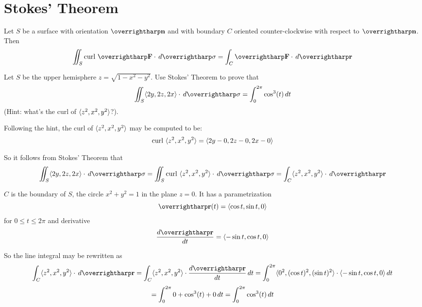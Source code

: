 \documentclass[letterpaper, twoside, 12pt]{book}
\begin{document}
\section{Stokes' Theorem}%

\begin{theorem}
  Let $S$ be a surface with orientation $\vect{n}$
  and with boundary $C$ oriented counter-clockwise with respect to $\vect{n}$.
  Then
  \[
    \iint_S \text{curl }\vect{F}\cdot\dvar{\vect\sigma}
      =
    \int_C \vect{F}\cdot\dvar{\vect{r}}
  \]
\end{theorem}

          \begin{problem}
            Let $S$ be the upper hemisphere $z=\sqrt{1-x^2-y^2}$. Use
            Stokes' Theorem to prove that
            \[
              \iint_S \<2y,2z,2x\>\cdot\dvar{\vect\sigma}
                =
              \int_0^{2\pi} \cos^3(t) \dvar{t}
            \]
            (Hint: what's the curl of $\langle z^2,x^2,y^2\rangle$?).
          \end{problem}

          \begin{solution}
            Following the hint, the curl of $\langle z^2,x^2,y^2\rangle$ may be computed
            to be:
            \[
              \text{curl }\langle z^2,x^2,y^2\rangle
                =
              \langle2y-0,2z-0,2x-0\rangle
            \]

            So it follows from Stokes' Theorem that
            \[
              \iint_S \<2y,2z,2x\>\cdot\dvar{\vect\sigma}
                =
              \iint_S \text{curl }\<z^2,x^2,y^2\>\cdot\dvar{\vect\sigma}
                =
              \int_C \<z^2,x^2,y^2\>\cdot\dvar{\vect r}
            \]

            $C$ is the boundary of $S$, the circle $x^2+y^2=1$ in the
            plane $z=0$. It has a parametrization
            \[
              \vect{r}(t) = \<\cos t,\sin t, 0\>
            \]
            for $0\leq t\leq 2\pi$ and derivative
            \[
              \frac{d\vect r}{dt} = \<-\sin t,\cos t, 0\>
            \]

            So the line integral may be rewritten as
            \[
              \int_C \<z^2,x^2,y^2\>\cdot\dvar{\vect r}
                =
              \int_C \<z^2,x^2,y^2\>\cdot\frac{d\vect r}{dt}\dvar{t}
                =
              \int_0^{2\pi}
              \<0^2,(\cos t)^2,(\sin t)^2\>
              \cdot
              \<-\sin t,\cos t, 0\>
              \dvar{t}
            \]
            \[
                =
              \int_0^{2\pi} 0 + \cos^3(t) + 0 \,d{t}
                =
              \int_0^{2\pi} \cos^3(t) \,d{t}
            \]
          \end{solution}
\end{document}
